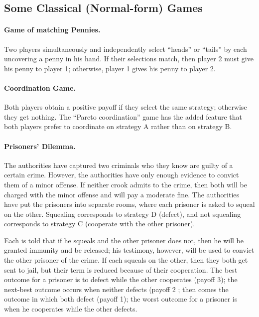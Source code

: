 \subsection{Some Classical (Normal-form) Games}
\label{2023-10-10:classicalgames}

\paragraph{Game of matching Pennies.} Two players simultaneously and independently select “heads” or “tails” by each uncovering a penny in his hand. If their selections match, then player 2 must give his penny to player 1; otherwise, player 1 gives his penny to player 2.

\paragraph{Coordination Game.} Both players obtain a positive payoff if they select the same strategy; otherwise they get nothing. The “Pareto coordination” game has the added feature that both players prefer to coordinate on strategy A rather than on strategy B.

\paragraph{Prisoners’ Dilemma.} The authorities have captured two criminals who they know are guilty of a certain crime. However, the authorities have only enough evidence to convict them of a minor offense. If neither crook admits to the crime, then both will be charged with the minor offense and will pay a moderate fine. The authorities have put the prisoners into separate rooms, where each prisoner is asked to squeal on the other. Squealing corresponds to strategy D (defect), and not squealing corresponds to strategy C (cooperate with the other prisoner).

Each is told that if he squeals and the other prisoner does not, then he will be granted immunity and be released; his testimony, however, will be used to convict the other prisoner of the crime. If each squeals on the other, then they both get sent to jail, but their term is reduced because of their cooperation. The best outcome for a prisoner is to defect while the other cooperates (payoff 3); the next-best outcome occurs when neither defects (payoff 2 ; then comes the outcome in which both defect (payoff 1); the worst outcome for a prisoner is when he cooperates while the other defects.

